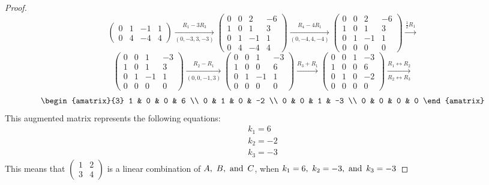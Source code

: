 \begin{proof}
\[\begin{pmatrix}
      0 & 1 & -1 & 1  \\
      0 & 4 & -4 & 4
    \end{pmatrix} \xrightarrow[(0,-3,3,-3)]{R_1 - 3R_3}
    \begin{pmatrix}
      0 & 0 & 2  & -6 \\
      1 & 0 & 1  & 3  \\
      0 & 1 & -1 & 1  \\
      0 & 4 & -4 & 4
    \end{pmatrix} \xrightarrow[(0,-4,4,-4)]{R_4 - 4R_1}
    \begin{pmatrix}
      0 & 0 & 2  & -6 \\
      1 & 0 & 1  & 3  \\
      0 & 1 & -1 & 1  \\
      0 & 0 & 0  & 0
    \end{pmatrix} \xrightarrow{\frac{1}{2}R_1}
  \]
  \[
    \begin{pmatrix}
      0 & 0 & 1  & -3 \\
      1 & 0 & 1  & 3  \\
      0 & 1 & -1 & 1  \\
      0 & 0 & 0  & 0
    \end{pmatrix} \xrightarrow[(0,0,-1,3)]{R_2 - R_1}
    \begin{pmatrix}
      0 & 0 & 1  & -3 \\
      1 & 0 & 0  & 6  \\
      0 & 1 & -1 & 1  \\
      0 & 0 & 0  & 0
    \end{pmatrix} \xrightarrow{R_3 + R_1}
    \begin{pmatrix}
      0 & 0 & 1 & -3 \\
      1 & 0 & 0 & 6  \\
      0 & 1 & 0 & -2 \\
      0 & 0 & 0 & 0
    \end{pmatrix} \xrightarrow[R_2 \leftrightarrow R_3]{R_1 \leftrightarrow R_2}
  \]
  \[
    \begin{amatrix}{3}
      1 & 0 & 0 & 6  \\
      0 & 1 & 0 & -2 \\
      0 & 0 & 1 & -3 \\
      0 & 0 & 0 & 0
    \end{amatrix}
  \]
  This augmented matrix represents the following equations:
  \begin{align*}
    k_1 = 6  \\
    k_2 = -2 \\
    k_3 = -3
  \end{align*}
  This means that $\begin{pmatrix}1 & 2 \\ 3 & 4\end{pmatrix}$ is a linear combination of $A,~B,\operatorname{~\text{and}~} C$, when $k_1 = 6,~k_2 = -3, \operatorname{~\text{and}~} k_3 = -3$
\end{proof}


